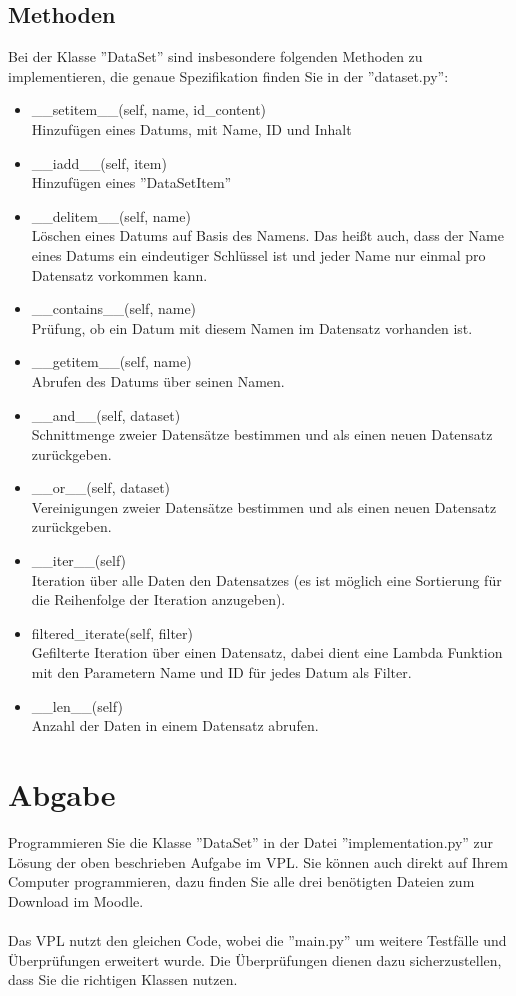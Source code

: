 \documentclass[
12pt, %
a4paper, %
parskip=full %
]{scrartcl}
\begin{document}
\subsection{Methoden}
Bei der Klasse ''DataSet'' sind insbesondere folgenden Methoden zu implementieren, die genaue Spezifikation finden Sie in der ''dataset.py'':\\
\begin{itemize}
    \item \_\_setitem\_\_(self, name, id\_content)\\
    Hinzufügen eines Datums, mit Name, ID und Inhalt
    \item \_\_iadd\_\_(self, item)\\
    Hinzufügen eines ''DataSetItem''
    \item \_\_delitem\_\_(self, name)\\
    Löschen eines Datums auf Basis des Namens.
    Das heißt auch, dass der Name eines Datums ein eindeutiger Schlüssel
    ist und jeder Name nur einmal pro Datensatz vorkommen kann.
    \item \_\_contains\_\_(self, name)\\
    Prüfung, ob ein Datum mit diesem Namen im Datensatz vorhanden ist.
    \item \_\_getitem\_\_(self, name)\\
    Abrufen des Datums über seinen Namen.
    \item \_\_and\_\_(self, dataset)\\
    Schnittmenge zweier Datensätze bestimmen und als einen neuen Datensatz zurückgeben.
    \item \_\_or\_\_(self, dataset)\\
    Vereinigungen zweier Datensätze bestimmen und als einen neuen Datensatz zurückgeben.
    \item \_\_iter\_\_(self)\\
    Iteration über alle Daten den Datensatzes (es ist möglich eine Sortierung
    für die Reihenfolge der Iteration anzugeben).
    \item filtered\_iterate(self, filter)\\
    Gefilterte Iteration über einen Datensatz, dabei dient eine Lambda Funktion mit den Parametern Name und ID für jedes Datum als Filter.
    \item \_\_len\_\_(self)\\
    Anzahl der Daten in einem Datensatz abrufen.
\end{itemize}
\section{Abgabe}
Programmieren Sie die Klasse ''DataSet'' in der Datei ''implementation.py'' zur
Lösung der oben beschrieben Aufgabe im VPL. Sie können auch direkt auf
Ihrem Computer programmieren, dazu finden Sie alle drei benötigten Dateien
zum Download im Moodle.\\\\
Das VPL nutzt den gleichen Code, wobei die ''main.py'' um weitere Testfälle und Überprüfungen erweitert wurde. Die Überprüfungen dienen dazu
sicherzustellen, dass Sie die richtigen Klassen nutzen.
\end{document}
